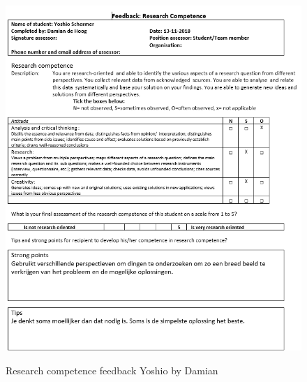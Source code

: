 \documentclass[12pt]{article}
\begin{document}
	\begin{figure}[p!]
		\centering
		\includegraphics[width=\columnwidth]{ResSklYoshio.PNG}\\
		\caption{Research competence feedback Yoshio by Damian}
	\end{figure}
\end{document}
